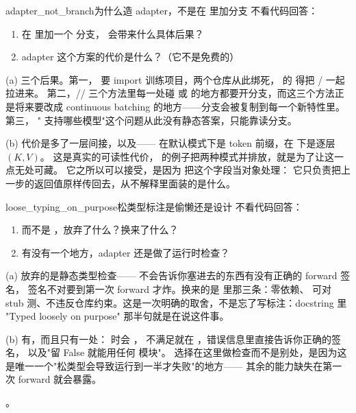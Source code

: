 \begin{checkpoint}{adapter_not_branch}{为什么造 adapter，不是在  里加分支}
不看代码回答：
\begin{enumerate}[label=(\alph*)]
  \item 在  里加一个  分支，
        会带来什么具体后果？
  \item adapter 这个方案的代价是什么？（它不是免费的）
\end{enumerate}

\ifshowanswers
\tcblower
\answer (a) 三个后果。第一， 要 import 训练项目，两个仓库从此绑死，
 的  得把 / 一起拉进来。
第二，// 三个方法里每一处碰
 或  的地方都要开分支，而这三个方法正是将来要改成
continuous batching 的地方——分支会被复制到每一个新特性里。第三，
" 支持哪些模型"这个问题从此没有静态答案，只能靠读分支。

(b) 代价是多了一层间接，以及——
 在默认模式下是 token 前缀，在  下是逐层 $(K,V)$。
这是真实的可读性代价， 的例子把两种模式并排放，就是为了让这一点无处可藏。
它之所以可以接受，是因为  把这个字段当对象处理：
它只负责把上一步的返回值原样传回去，从不解释里面装的是什么。
\fi
\end{checkpoint}

\begin{checkpoint}{loose_typing_on_purpose}{松类型标注是偷懒还是设计}
不看代码回答：
\begin{enumerate}[label=(\alph*)]
  \item {} 而不是 ，放弃了什么？换来了什么？
  \item 有没有一个地方，adapter 还是做了运行时检查？
\end{enumerate}

\ifshowanswers
\tcblower
\answer (a) 放弃的是静态类型检查—— 不会告诉你塞进去的东西有没有正确的 forward 签名，
签名不对要到第一次 forward 才炸。换来的是  里那三条：零依赖、
可对 stub 测、不违反仓库约束。这是一次明确的取舍，不是忘了写标注：docstring 里
"Typed loosely on purpose" 那半句就是在说这件事。

(b) 有，而且只有一处： 时会 ，
不满足就在 ，错误信息里直接告诉你正确的签名，
以及"留 False 就能用任何  模块"。
选择在这里做检查而不是别处，是因为这是唯一一个"松类型会导致运行到一半才失败"的地方——
其余的能力缺失在第一次 forward 就会暴露。

\whereincode {}。
\fi
\end{checkpoint}

